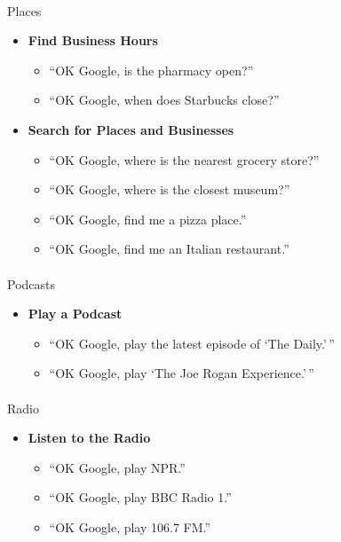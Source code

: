 \documentclass[
  a4paper,
]{article}
\makeatletter
\let\oldparagraph\paragraph
\renewcommand{\paragraph}{
    \@ifstar
      \xxxParagraphStar
      \xxxParagraphNoStar
  }
\newcommand{\xxxParagraphStar}[1]{\oldparagraph*{#1}\mbox{}}
\newcommand{\xxxParagraphNoStar}[1]{\oldparagraph{#1}\mbox{}}
\providecommand{\tightlist}{%
  \setlength{\itemsep}{0pt}\setlength{\parskip}{0pt}}\usepackage{longtable,booktabs,array}
\makeatother
\begin{document}
\paragraph{Places}\label{places}

\begin{itemize}
\tightlist
\item
  \textbf{Find Business Hours}

  \begin{itemize}
  \tightlist
  \item
    ``OK Google, is the pharmacy open?''
  \item
    ``OK Google, when does Starbucks close?''
  \end{itemize}
\item
  \textbf{Search for Places and Businesses}

  \begin{itemize}
  \tightlist
  \item
    ``OK Google, where is the nearest grocery store?''
  \item
    ``OK Google, where is the closest museum?''
  \item
    ``OK Google, find me a pizza place.''
  \item
    ``OK Google, find me an Italian restaurant.''
  \end{itemize}
\end{itemize}

\paragraph{Podcasts}\label{podcasts}

\begin{itemize}
\tightlist
\item
  \textbf{Play a Podcast}

  \begin{itemize}
  \tightlist
  \item
    ``OK Google, play the latest episode of `The Daily.'\,''
  \item
    ``OK Google, play `The Joe Rogan Experience.'\,''
  \end{itemize}
\end{itemize}

\paragraph{Radio}\label{radio}

\begin{itemize}
\tightlist
\item
  \textbf{Listen to the Radio}

  \begin{itemize}
  \tightlist
  \item
    ``OK Google, play NPR.''
  \item
    ``OK Google, play BBC Radio 1.''
  \item
    ``OK Google, play 106.7 FM.''
  \end{itemize}
\end{itemize}
\end{document}
